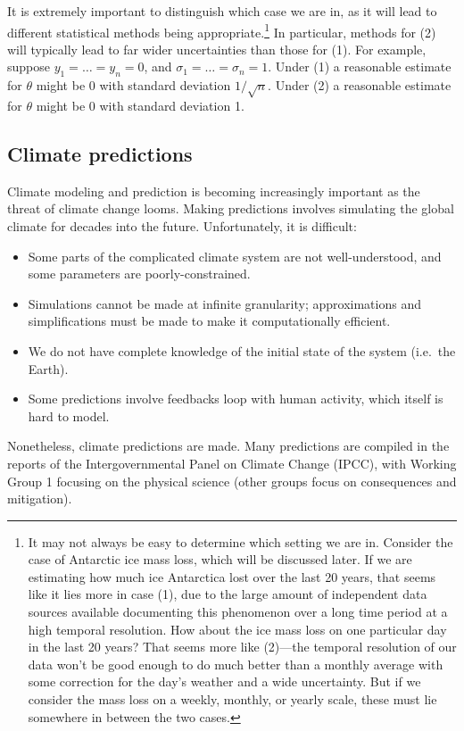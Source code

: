 \documentclass[12pt]{article}
\begin{document}
It is extremely important to distinguish which case we are in, as it will lead to different statistical methods being appropriate.\footnote{It may not always be easy to determine which setting we are in. Consider the case of Antarctic ice mass loss, which will be discussed later. If we are estimating how much ice Antarctica lost over the last 20 years, that seems like it lies more in case (1), due to the large amount of independent data sources available documenting this phenomenon over a long time period at a high temporal resolution. How about the ice mass loss on one particular day in the last 20 years? That seems more like (2)---the temporal resolution of our data won't be good enough to do much better than a monthly average with some correction for the day's weather and a wide uncertainty. But if we consider the mass loss on a weekly, monthly, or yearly scale, these must lie somewhere in between the two cases.} In particular, methods for (2) will typically lead to far wider uncertainties than those for (1). For example, suppose $y_1=\ldots=y_n=0$, and $\sigma_1=\ldots=\sigma_n=1$. Under (1) a reasonable estimate for $\theta$ might be $0$ with standard deviation $1/\sqrt{n}$. Under (2) a reasonable estimate for $\theta$ might be $0$ with standard deviation 1.

\subsection{Climate predictions}

Climate modeling and prediction is becoming increasingly important as the threat of climate change looms. Making predictions involves simulating the global climate for decades into the future. Unfortunately, it is difficult:
\begin{itemize}
  \item Some parts of the complicated climate system are not well-understood, and some parameters are poorly-constrained.
  \item Simulations cannot be made at infinite granularity; approximations and simplifications must be made to make it computationally efficient.
  \item We do not have complete knowledge of the initial state of the system (i.e.~the Earth).
  \item Some predictions involve feedbacks loop with human activity, which itself is hard to model.
\end{itemize}
Nonetheless, climate predictions are made. Many predictions are compiled in the reports of the Intergovernmental Panel on Climate Change (IPCC), with Working Group 1 \citeyearpar{ipcc2021physical}focusing on the physical science (other groups focus on consequences and mitigation).
\end{document}
